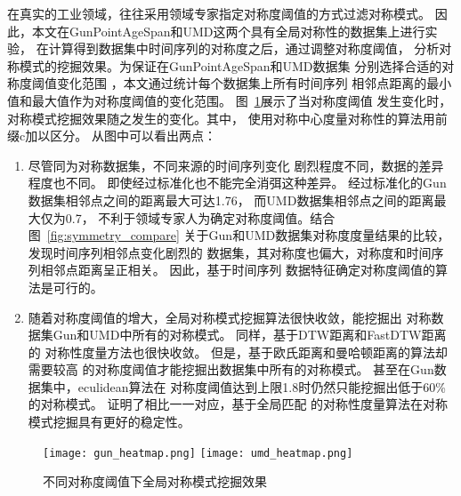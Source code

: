 在真实的工业领域，往往采用领域专家指定对称度阈值的方式过滤对称模式。
因此，本文在GunPointAgeSpan和UMD这两个具有全局对称性的数据集上进行实验，
在计算得到数据集中时间序列的对称度之后，通过调整对称度阈值，
分析对称模式的挖掘效果。为保证在GunPointAgeSpan和UMD数据集
分别选择合适的对称度阈值变化范围
，本文通过统计每个数据集上所有时间序列
相邻点距离的最小值和最大值作为对称度阈值的变化范围。
图~\ref{fig:symmetry_heatmap}展示了当对称度阈值
发生变化时，对称模式挖掘效果随之发生的变化。其中，
使用对称中心度量对称性的算法用前缀c加以区分。
从图中可以看出两点：
\begin{enumerate}
  \item 尽管同为对称数据集，不同来源的时间序列变化
        剧烈程度不同，数据的差异程度也不同。
        即使经过标准化也不能完全消弭这种差异。
        经过标准化的Gun数据集相邻点之间的距离最大可达1.76，
        而UMD数据集相邻点之间的距离最大仅为0.7，
        不利于领域专家人为确定对称度阈值。结合图~\ref{fig:symmetry_compare}
        关于Gun和UMD数据集对称度度量结果的比较，发现时间序列相邻点变化剧烈的
        数据集，其对称度也偏大，对称度和时间序列相邻点距离呈正相关。
        因此，基于时间序列
        数据特征确定对称度阈值的算法是可行的。
  \item 随着对称度阈值的增大，全局对称模式挖掘算法很快收敛，能挖掘出
        对称数据集Gun和UMD中所有的对称模式。
        同样，基于DTW距离和FastDTW距离的
        对称性度量方法也很快收敛。
        但是，基于欧氏距离和曼哈顿距离的算法却需要较高
        的对称度阈值才能挖掘出数据集中所有的对称模式。
        甚至在Gun数据集中，eculidean算法在
        对称度阈值达到上限1.8时仍然只能挖掘出低于60\%的对称模式。
        证明了相比一一对应，基于全局匹配
        的对称性度量算法在对称模式挖掘具有更好的稳定性。

\end{enumerate}
\begin{figure}
  \centering
  {\texttt{[image: gun\_heatmap.png]}}
  {\texttt{[image: umd\_heatmap.png]}}
  \caption{不同对称度阈值下全局对称模式挖掘效果}
  \label{fig:symmetry_heatmap}
\end{figure}


